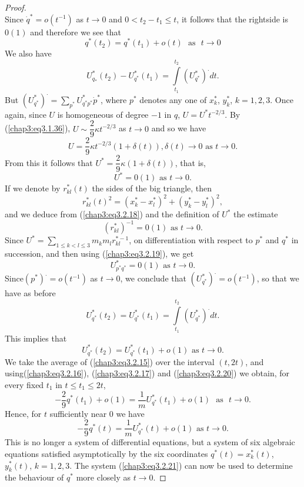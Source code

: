\begin{proof}
$$$$
Since $\dot{q}^* = o (t^{-1})$ as $t \to 0$ and $0 < t_2 - t_1 \leq
t$, it follows that the right\pageoriginale side is $0(1)$   and
therefore we see that  
\begin{equation*}
q^* (t_2) = q^* (t_1) + o(t) \text{~ as ~} t \to 0
\tag{3.2.17}\label{chap3:eq3.2.17} 
\end{equation*}
We also have 
$$
U^*_{q_*} (t_2) - U^*_{q^*} (t_1) = \int\limits^{t_2}_{t_1} (U^*_{q^*})^. dt.  
$$
But $(U^*_{q^*})^. = \sum\limits_{p^*} U^*_{q^* p^*} \dot{p}^*$, where
$p^*$ denotes any one of $x^*_k$, $y^*_k$, $k = 1,2,3$. Once again,
since $U$ is homogeneous of degree $-1$ in $q$, $U = U^* t^{-2/3}$. By
(\ref{chap3:eq3.1.36}), $U \sim \dfrac{2}{9} \kappa t^{-2/3}$ as $t
\to 0$ and so we have  
$$
U = \frac{2}{9} \kappa t^{-2/3} (1+ \delta (t)), \delta (t) \to 0
\text{ as } t \to 0.  
$$
From this it follows that $U^* = \dfrac{2}{9} \kappa (1+ \delta (t))$,
that is, 
\begin{equation*}
U^* = 0(1) \text{ as } t \to 0. \tag{3.2.18}\label{chap3:eq3.2.18}
\end{equation*}
If we denote by $r^*_{kl} (t)$ the sides of the big triangle, then 
$$
r^*_{kl} (t)^2 = (x^*_k - x^*_l)^2 + (y^*_k - y^*_l)^2,
$$
and we deduce from (\ref{chap3:eq3.2.18}) and the definition of $U^*$
the estimate 
\begin{equation*}
(r^*_{kl})^{-1} = 0 (1) \text{ as } t \to
  0. \tag{3.2.19}\label{chap3:eq3.2.19} 
\end{equation*}
Since $U^* = \sum\limits_{1 \leq k < l \leq 3} m_k m_l r^{*-1}_{kl}$,
on differentiation with respect to $p^*$ and $q^*$ in succession, and
then using (\ref{chap3:eq3.2.19}), we get 
$$
U^*_{p^*q^*} = 0 (1) \text{ as } t \to 0. 
$$
Since\pageoriginale $(p^*)^. = o (t^{-1})$ as $t \to 0$, we conclude
that $(U^*_{q^*})^. = o (t^{-1})$, so that we have as before  
$$
U^*_{q^*} (t_2) = U^*_{q^*} (t_1) = \int\limits^{t_2}_{t_1} (U^*_{q^*})^. dt. 
$$
This implies that 
\begin{equation*}
U^*_{q^*} (t_2) = U^*_{q^*} (t_1) + o(1) \text{ as } t \to
0. \tag{3.2.20} \label{chap3:eq3.2.20} 
\end{equation*}
We take the average of (\ref{chap3:eq3.2.15}) over the interval $(t,
2t)$, and using\break (\ref{chap3:eq3.2.16}), (\ref{chap3:eq3.2.17})
and (\ref{chap3:eq3.2.20}) we obtain, for every fixed $t_1$ in $t \leq
t _1 \leq 2t$, 
$$
-\frac{2}{9} q^*(t_1) + o(1) = \frac{1}{m} U^*_{q^*} (t_1) + o(1)
\text{~ as ~} t \to 0. 
$$
Hence, for $t$ sufficiently near 0 we have
\begin{equation*}
-\frac{2}{9} q^* (t) = \frac{1}{m} U^*_{q^*} (t) + o(1) \text{ as } t
\to 0. \tag{3.2.21}\label{chap3:eq3.2.21} 
\end{equation*}
This is no longer a system of differential equations, but a system of
six algebraic equations satisfied asymptotically by the six
coordinates $q^*(t) = x^*_k(t)$, $y^*_k(t)$, $k = 1,2,3$. The system
(\ref{chap3:eq3.2.21}) can now be used to determine the behaviour of
$q^*$ more closely as $t \to 0$.  


\end{proof}
